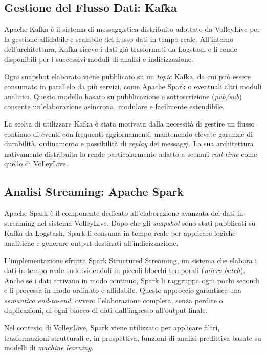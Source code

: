 \documentclass[a4paper,12pt]{report}
\begin{document}
\subsection{Gestione del Flusso Dati: Kafka}

Apache Kafka è il sistema di messaggistica distribuito adottato da VolleyLive per la gestione affidabile e scalabile del flusso dati in tempo reale. All’interno dell’architettura, Kafka riceve i dati già trasformati da Logstash e li rende disponibili per i successivi moduli di analisi e indicizzazione.

Ogni snapshot elaborato viene pubblicato su un \textit{topic} Kafka, da cui può essere consumato in parallelo da più servizi, come Apache Spark o eventuali altri moduli analitici. Questo modello basato su pubblicazione e sottoscrizione (\textit{pub/sub}) consente un’elaborazione asincrona, modulare e facilmente estendibile.

La scelta di utilizzare Kafka è stata motivata dalla necessità di gestire un flusso continuo di eventi con frequenti aggiornamenti, mantenendo elevate garanzie di durabilità, ordinamento e possibilità di \textit{replay} dei messaggi. La sua architettura nativamente distribuita lo rende particolarmente adatto a scenari \textit{real-time} come quello di VolleyLive.


\subsection{Analisi Streaming: Apache Spark}

Apache Spark è il componente dedicato all’elaborazione avanzata dei dati in streaming nel sistema VolleyLive. Dopo che gli \textit{snapshot} sono stati pubblicati su Kafka da Logstash, Spark li consuma in tempo reale per applicare logiche analitiche e generare output destinati all’indicizzazione.

L’implementazione sfrutta Spark Structured Streaming, un sistema che elabora i dati in tempo reale suddividendoli in piccoli blocchi temporali (\textit{micro-batch}). Anche se i dati arrivano in modo continuo, Spark li raggruppa ogni pochi secondi e li processa in modo ordinato e affidabile. Questo approccio garantisce una \textit{semantica end-to-end}, ovvero l’elaborazione completa, senza perdite o duplicazioni, di ogni blocco di dati dall’ingresso all’output finale.

Nel contesto di VolleyLive, Spark viene utilizzato per applicare filtri, trasformazioni strutturali e, in prospettiva, funzioni di analisi predittiva basate su modelli di \textit{machine learning}.
\end{document}
